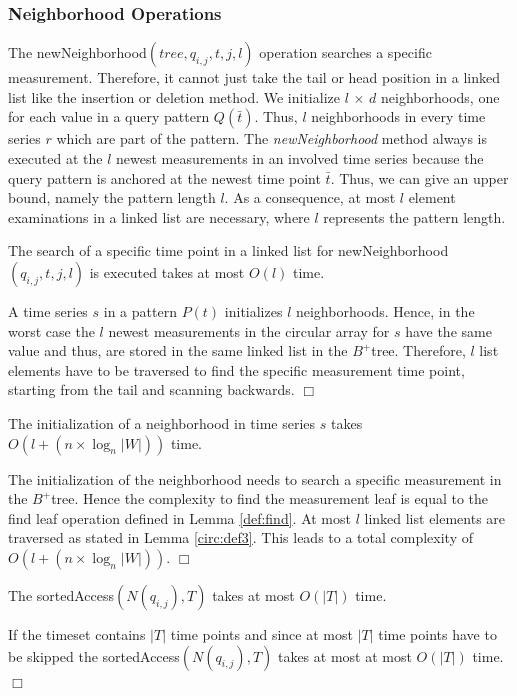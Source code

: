 \documentclass[abstracton,12pt,oneside]{scrreprt}
\newenvironment{proof}
  {\noindent{\bf Proof:\rm}}{\hfill$\Box$\vspace{\medskipamount}}
\begin{document}
\subsubsection{Neighborhood Operations}
 The newNeighborhood$(tree,q_{i,j},t,j,l)$ operation searches a specific measurement. Therefore, it cannot just take the tail or head position in a linked list like the insertion or deletion method. We initialize $l$ $\times$ $d$ neighborhoods, one for each value in a query pattern $Q(\bar{t})$. Thus, $l$ neighborhoods in every time series $r$ which are part of the pattern. The \emph{newNeighborhood} method always is executed at the $l$ newest measurements in an involved time series because the query pattern is anchored at the newest time point $\bar{t}$. Thus, we can give an upper bound, namely the pattern length $l$. As a consequence, at most $l$ element examinations in a linked list are necessary, where $l$ represents the pattern length.
 
 \begin{mydef}
 	The search of a specific time point in a linked list for newNeighborhood$(q_{i,j},t,j,l)$ is executed takes at most $O(l)$ time.
 	\label{circ:def3}
 \end{mydef}
 \begin{proof}
 	A time series $s$ in a pattern $P(t)$ initializes $l$ neighborhoods. Hence, in the worst case the $l$ newest measurements in the circular array for $s$ have the same value and thus, are stored in the same linked list in the $B^+$tree. Therefore, $l$ list elements have to be traversed to find the specific measurement time point, starting from the tail and scanning backwards. 
 \end{proof}
 
\begin{mydef}
	The initialization of a neighborhood in time series $s$ takes $O(l+(n \times \log_{n}|W|))$ time. \label{initNC}
\end{mydef}
\begin{proof}
	The initialization of the neighborhood needs to search a specific measurement in the $B^+$tree. Hence the complexity to find the measurement leaf is equal to the find leaf operation defined in Lemma \ref{def:find}. At most $l$ linked list elements are traversed as stated in Lemma \ref{circ:def3}. This leads to a total complexity of $O(l+(n \times \log_{n}|W|))$.
\end{proof}

\begin{mydef}
	The sortedAccess$(N(q_{i,j}),T)$ takes at most $O(|T|)$ time. \label{sAC}
\end{mydef}
\begin{proof}
	If the timeset contains $|T|$ time points and since at most $|T|$ time points have to be skipped the sortedAccess$(N(q_{i,j}),T)$ takes at most at most $O(|T|)$ time. 
\end{proof}
\end{document}
